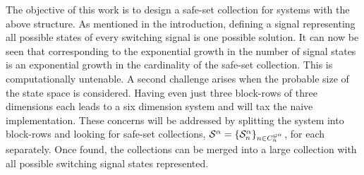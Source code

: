 The objective of this work is to design a safe-set collection for systems with the above structure. As mentioned in the introduction, defining a signal representing all possible states of every switching signal is one possible solution. It can now be seen that corresponding to the exponential growth in the number of signal states is an exponential growth in the cardinality of the safe-set collection. This is computationally untenable. A second challenge arises when the probable size of the state space is considered. Having even just three block-rows of three dimensions each leads to a six dimension system and will tax the naive implementation. These concerns will be addressed by splitting the system into block-rows and looking for safe-set collections, $\mathcal{S}^{\agentidx}=\{\mathcal{S}^\agentidx_n\}_{n\in\gnumnodes[\agentidx]}$, for each separately. Once found, the collections can be merged into a large collection with all possible switching signal states represented.


